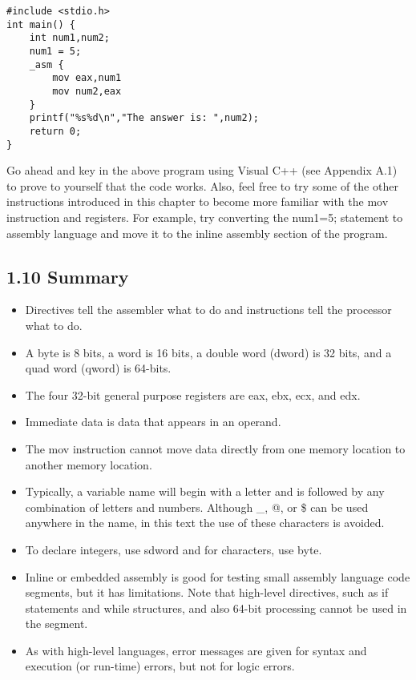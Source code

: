 \documentclass[10pt]{article}
\begin{document}
\begin{verbatim}
#include <stdio.h>
int main() {
    int num1,num2;
    num1 = 5;
    _asm {
        mov eax,num1
        mov num2,eax
    }
    printf("%s%d\n","The answer is: ",num2);
    return 0;
}
\end{verbatim}

Go ahead and key in the above program using Visual C++ (see Appendix A.1) to prove to yourself that the code works. Also, feel free to try some of the other instructions introduced in this chapter to become more familiar with the mov instruction and registers. For example, try converting the num1=5; statement to assembly language and move it to the inline assembly section of the program.

\subsection*{1.10 Summary}
\begin{itemize}
  \item Directives tell the assembler what to do and instructions tell the processor what to do.
  \item A byte is 8 bits, a word is 16 bits, a double word (dword) is 32 bits, and a quad word (qword) is 64-bits.
  \item The four 32-bit general purpose registers are eax, ebx, ecx, and edx.
  \item Immediate data is data that appears in an operand.
  \item The mov instruction cannot move data directly from one memory location to another memory location.
  \item Typically, a variable name will begin with a letter and is followed by any combination of letters and numbers. Although \_, @, or \$ can be used anywhere in the name, in this text the use of these characters is avoided.
  \item To declare integers, use sdword and for characters, use byte.
  \item Inline or embedded assembly is good for testing small assembly language code segments, but it has limitations. Note that high-level directives, such as if statements and while structures, and also 64-bit processing cannot be used in the segment.
  \item As with high-level languages, error messages are given for syntax and execution (or run-time) errors, but not for logic errors.
\end{itemize}
\end{document}
